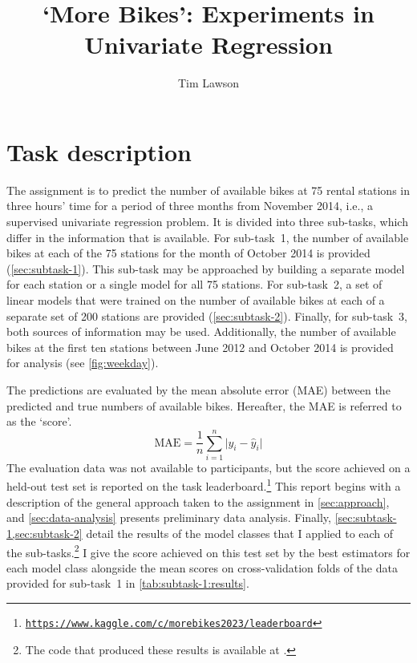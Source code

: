 \documentclass[11pt]{extarticle}
\newcommand{\kaggle}{https://www.kaggle.com/c/morebikes2023/leaderboard}
\begin{document}
\title{`More Bikes': Experiments in Univariate Regression}
\author[]{Tim Lawson}
\date{}

\maketitle

\section{Task description}
\label{sec:task-description}

The assignment is to predict the number of available bikes at 75 rental stations in
three hours' time for a period of three months from November 2014, i.e., a supervised
univariate regression problem.
It is divided into three sub-tasks, which differ in the information that is available.
For sub-task~1, the number of available bikes at each of the 75 stations for the month
of October 2014 is provided (\cref{sec:subtask-1}).
This sub-task may be approached by building a separate model for each station or a
single model for all 75 stations.
For sub-task~2, a set of linear models that were trained on the number of available
bikes at each of a separate set of 200 stations are provided (\cref{sec:subtask-2}).
Finally, for sub-task~3, both sources of information may be used.
Additionally, the number of available bikes at the first ten stations between June 2012
and October 2014 is provided for analysis (see \cref{fig:weekday}).

The predictions are evaluated by the mean absolute error (MAE) between the predicted
and true numbers of available bikes.
Hereafter, the MAE is referred to as the `score'.
\begin{equation}
  \label{eq:mae}
  \text{MAE} = \frac{1}{n} \sum_{i = 1}^n \lvert y_i - \hat{y}_i \rvert
\end{equation}
The evaluation data was not available to participants, but the score achieved on a
held-out test set is reported on the task
leaderboard.\footnote{\href{\kaggle}{\texttt{\kaggle}}} This report begins with a
description of the general approach taken to the assignment in \cref{sec:approach}, and
\cref{sec:data-analysis} presents preliminary data analysis.
Finally, \cref{sec:subtask-1,sec:subtask-2} detail the results of the model classes
that I applied to each of the sub-tasks.\footnote{The code that produced these results
  is available at .
}
I give the score achieved on this test set by the best estimators for each model class
alongside the mean scores on cross-validation folds of the data provided for sub-task~1
in \cref{tab:subtask-1:results}.
\end{document}
